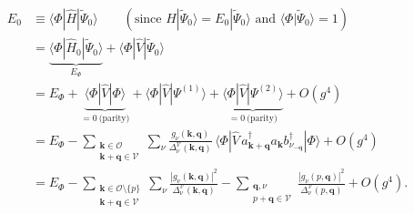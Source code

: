 \begin{align}
E_0&\equiv\langle\Phi|\hat H|\tilde\Psi_0\rangle
\qquad\left(\text{since }\hat H|\tilde\Psi_0\rangle=E_0|\tilde\Psi_0\rangle\text{ and }\langle\Phi|\tilde\Psi_0\rangle=1\right)\\
&=\underbrace{\langle\Phi|\hat H_0|\tilde\Psi_0\rangle}_{E_\Phi}+\langle\Phi|\hat V|\tilde\Psi_0\rangle
\\
&=E_\Phi+\underbrace{\langle\Phi|\hat V|\Phi\rangle}_{=0\ \text{(parity)}}+\langle\Phi|\hat V|\Psi^{(1)}\rangle
+\underbrace{\langle\Phi|\hat V|\Psi^{(2)}\rangle}_{=0\ \text{(parity)}}+O(g^4)\\
&=E_\Phi-\sum_{\substack{\bm k\in\mathcal O\\ \bm k+\bm q\in\mathcal V}}\sum_\nu\frac{g_\nu(\bm k,\bm q)}{\Delta^{\mathcal V}_\nu(\bm k,\bm q)}
\,\langle\Phi|\hat V\,a^\dagger_{\bm k+\bm q}a_{\bm k}b^\dagger_{\nu_{-\bm q}}|\Phi\rangle+O(g^4)\\
&=E_\Phi-\sum_{\substack{\bm k\in\mathcal O\setminus\{p\}\\ \bm k+\bm q\in\mathcal V}}\sum_\nu\frac{|g_\nu(\bm k,\bm q)|^2}{\Delta^{\mathcal V}_\nu(\bm k,\bm q)}
-\sum_{\substack{\bm q,\nu\\ p+\bm q\in\mathcal V}}\frac{|g_\nu(p,\bm q)|^2}{\Delta^{\mathcal V}_\nu(p,\bm q)}+O(g^4).
\end{align}
